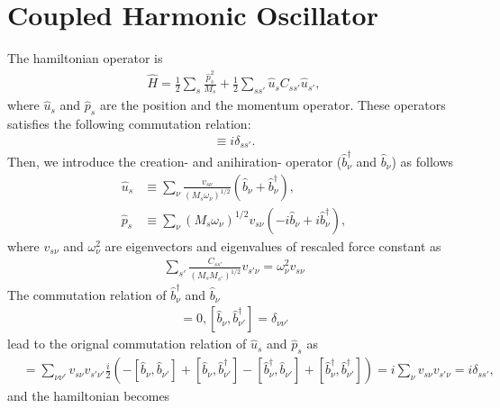 \documentclass{article}
\begin{document}
\section{Coupled Harmonic Oscillator}

The hamiltonian operator is
\begin{align}
    \hat{H} = \frac{1}{2}\sum_{s}\frac{\hat{p}_s^2}{M_s} + \frac{1}{2}\sum_{s s'} \hat{u}_s  C_{s s'} \hat{u}_{s'},
\end{align}
where $\hat{u}_s$ and $\hat{p}_s$ are the position and the momentum operator.
These operators satisfies the following commutation relation:
\begin{align}
    [\hat{u}_s, \hat{p}_{s'}] \equiv i \delta_{s s'}.
\end{align}
Then, we introduce the creation- and anihiration- operator ($\hat{b}_\nu^\dagger$ and $\hat{b}_\nu$)
as follows
\begin{align}
    \hat{u}_s &\equiv \sum_{\nu} \frac{v_{s \nu}}{(M_s \omega_\nu)^{1/2}} (\hat{b}_\nu + \hat{b}_\nu^\dagger),
    \\
    \hat{p}_s &\equiv \sum_{\nu} (M_s \omega_\nu)^{1/2} v_{s \nu}(-i \hat{b}_\nu + i \hat{b}_\nu^\dagger),
\end{align}
where $v_{s \nu}$ and $\omega_\nu^2$ are eigenvectors and eigenvalues of rescaled force constant as
\begin{align}
    \sum_{s'} \frac{C_{s s'}}{(M_s M_{s'})^{1/2}} v_{s' \nu} = \omega_\nu^2 v_{s \nu}
\end{align}
The commutation relation of $\hat{b}_\nu^\dagger$ and $\hat{b}_\nu$
\begin{align}
    [\hat{b}_\nu, \hat{b}_{\nu'}] = 0, [\hat{b}_\nu, \hat{b}_{\nu'}^\dagger] = \delta_{\nu \nu'}
\end{align}
lead to the orignal commutation relation of $\hat{u}_s$ and $\hat{p}_s$ as
\begin{align}
    [\hat{u}_s, \hat{p}_{s'}] &= \sum_{\nu \nu'} v_{s \nu} v_{s' \nu'}
    \frac{i}{2}(-[\hat{b}_\nu, \hat{b}_{\nu'}] + [\hat{b}_\nu, \hat{b}_{\nu'}^\dagger]
    -[\hat{b}_\nu^\dagger, \hat{b}_{\nu'}] + [\hat{b}_\nu^\dagger, \hat{b}_{\nu'}^\dagger])
    = i \sum_\nu v_{s \nu} v_{s' \nu} = i \delta_{s s'},
\end{align}
and the hamiltonian becomes
\end{document}
